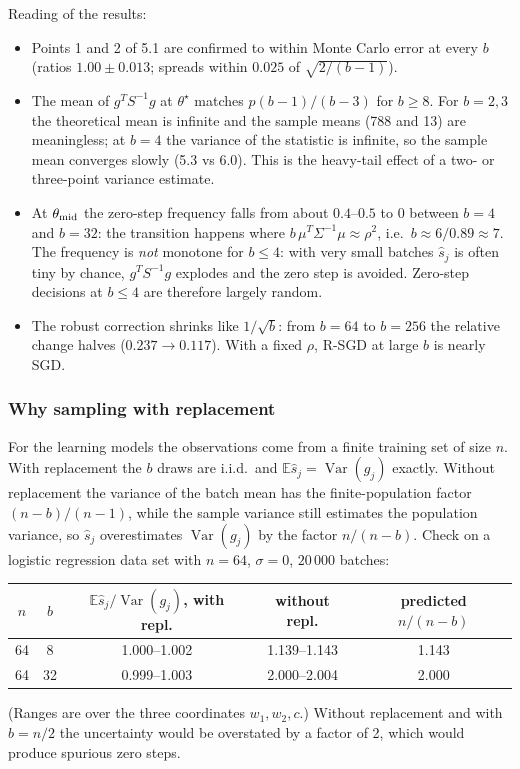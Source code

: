 \documentclass[11pt,a4paper]{article}
\newcommand{\E}{\mathbb{E}}
\DeclareMathOperator{\Var}{Var}
\begin{document}
Reading of the results:
\begin{itemize}
\item Points 1 and 2 of 5.1 are confirmed to within Monte Carlo error at every $b$
(ratios $1.00\pm0.013$; spreads within $0.025$ of $\sqrt{2/(b-1)}$).
\item The mean of $g^TS^{-1}g$ at $\theta^\star$ matches $p(b-1)/(b-3)$ for $b\ge8$. For
$b=2,3$ the theoretical mean is infinite and the sample means (788 and 13) are
meaningless; at $b=4$ the variance of the statistic is infinite, so the sample mean
converges slowly (5.3 vs 6.0). This is the heavy-tail effect of a two- or
three-point variance estimate.
\item At $\theta_{\rm mid}$ the zero-step frequency falls from about $0.4$--$0.5$ to
$0$ between $b=4$ and $b=32$: the transition happens where
$b\,\mu^T\Sigma^{-1}\mu\approx\rho^2$, i.e.\ $b\approx6/0.89\approx7$. The frequency is
\emph{not} monotone for $b\le4$: with very small batches $\widehat s_j$ is often tiny by
chance, $g^TS^{-1}g$ explodes and the zero step is avoided. Zero-step decisions at
$b\le4$ are therefore largely random.
\item The robust correction shrinks like $1/\sqrt b$: from $b=64$ to $b=256$ the
relative change halves ($0.237\to0.117$). With a fixed $\rho$, R-SGD at large $b$ is
nearly SGD.
\end{itemize}

\subsubsection*{Why sampling with replacement}

For the learning models the observations come from a finite training set of size $n$.
With replacement the $b$ draws are i.i.d.\ and $\E\widehat s_j=\Var(g_j)$ exactly.
Without replacement the variance of the batch mean has the finite-population factor
$(n-b)/(n-1)$, while the sample variance still estimates the population variance, so
$\widehat s_j$ overestimates $\Var(g_j)$ by the factor $n/(n-b)$. Check on a logistic
regression data set with $n=64$, $\sigma=0$, $20\,000$ batches:

\begin{center}
\begin{tabular}{@{}ccccc@{}}
\toprule
$n$ & $b$ & $\E\widehat s_j/\Var(g_j)$, with repl. & without repl. & predicted $n/(n-b)$ \\
\midrule
64 & 8 & 1.000--1.002 & 1.139--1.143 & 1.143 \\
64 & 32 & 0.999--1.003 & 2.000--2.004 & 2.000 \\
\bottomrule
\end{tabular}
\end{center}
(Ranges are over the three coordinates $w_1,w_2,c$.) Without replacement and with
$b=n/2$ the uncertainty would be overstated by a factor of 2, which would produce
spurious zero steps.
\end{document}
